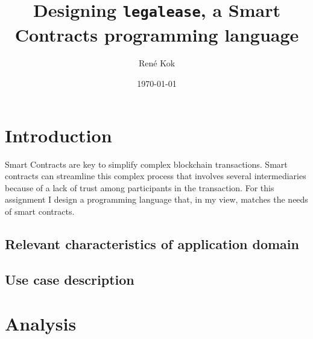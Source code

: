 \documentclass{uva-inf-article}
\title{Designing \texttt{legalease}, a Smart Contracts programming language}
\author{René Kok}
\date{\today}
\begin{document}
\maketitle




\section{Introduction}
Smart Contracts \cite{what-are-smart-contracts} are key to simplify complex blockchain transactions.
Smart contracts can streamline this complex process that involves several intermediaries because of a 
lack of trust among participants in the transaction.
For this assignment I design a programming language that, in my view, matches the needs of smart contracts.

\subsection{Relevant characteristics of application domain}

\subsection{Use case description}


\section{Analysis}
\end{document}
